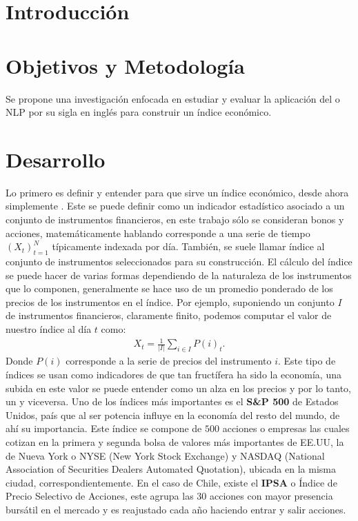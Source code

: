 \documentclass{article}
\begin{document}
\section{Introducción}

\section{Objetivos y Metodología}
    Se propone una investigación enfocada en estudiar y evaluar la aplicación del 
    o NLP por su sigla en inglés para construir un índice económico.

\section{Desarrollo}
    Lo primero es definir y entender para que sirve un índice económico, desde ahora simplemente . Este se puede definir como un indicador estadístico asociado a un conjunto de instrumentos financieros, en este trabajo sólo se consideran bonos y acciones, matemáticamente hablando corresponde a una serie de tiempo $(X_t)_{t=1}^{N}$ típicamente indexada por día. También, se suele llamar índice al conjunto de instrumentos seleccionados para su construcción. El cálculo del índice se puede hacer de varias formas dependiendo de la naturaleza de los instrumentos que lo componen, generalmente se hace uso de un promedio ponderado de los precios de los instrumentos en el índice. Por ejemplo, suponiendo un conjunto $I$ de instrumentos financieros, claramente finito, podemos computar el valor de nuestro índice al día $t$ como:
    \begin{align*}
    	X_t = \frac{1}{|I|}\sum_{i \in I} P(i)_t.
    \end{align*}
   	Donde $P(i)$ corresponde a la serie de precios del instrumento $i$. Este tipo de índices se usan como indicadores de que tan fructífera ha sido la economía, una subida en este valor se puede entender como un alza en los precios y por lo tanto, un  y viceversa. Uno de los índices más importantes es el \textbf{S\&}\textbf{P 500} de Estados Unidos, país que al ser potencia influye en la economía del resto del mundo, de ahí su importancia. Este índice se compone de $500$ acciones o empresas las cuales cotizan en la primera y segunda bolsa de valores más importantes de EE.UU, la de Nueva York o NYSE (New York Stock Exchange) y NASDAQ (National Association of Securities Dealers Automated Quotation), ubicada en la misma ciudad, correspondientemente. En el caso de Chile, existe el \textbf{IPSA} o Índice de Precio Selectivo de Acciones, este agrupa las $30$ acciones con mayor presencia bursátil en el mercado y es reajustado cada año haciendo entrar y salir acciones.
\end{document}
